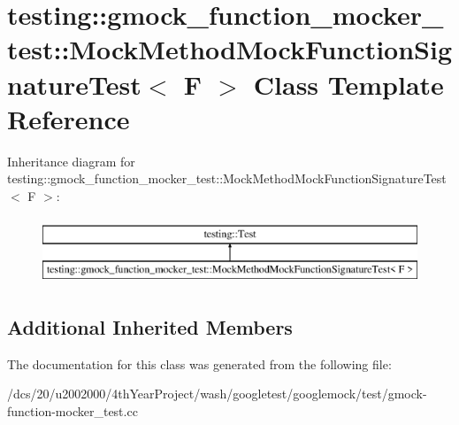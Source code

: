 \hypertarget{classtesting_1_1gmock__function__mocker__test_1_1MockMethodMockFunctionSignatureTest}{}\section{testing\+:\+:gmock\+\_\+function\+\_\+mocker\+\_\+test\+:\+:Mock\+Method\+Mock\+Function\+Signature\+Test$<$ F $>$ Class Template Reference}
\label{classtesting_1_1gmock__function__mocker__test_1_1MockMethodMockFunctionSignatureTest}
Inheritance diagram for testing\+:\+:gmock\+\_\+function\+\_\+mocker\+\_\+test\+:\+:Mock\+Method\+Mock\+Function\+Signature\+Test$<$ F $>$\+:\begin{figure}[H]
\begin{center}
\leavevmode
\includegraphics[height=2.000000cm]{classtesting_1_1gmock__function__mocker__test_1_1MockMethodMockFunctionSignatureTest}
\end{center}
\end{figure}
\subsection*{Additional Inherited Members}


The documentation for this class was generated from the following file\+:\begin{DoxyCompactItemize}
\item 
/dcs/20/u2002000/4th\+Year\+Project/wash/googletest/googlemock/test/gmock-\/function-\/mocker\+\_\+test.\+cc\end{DoxyCompactItemize}
